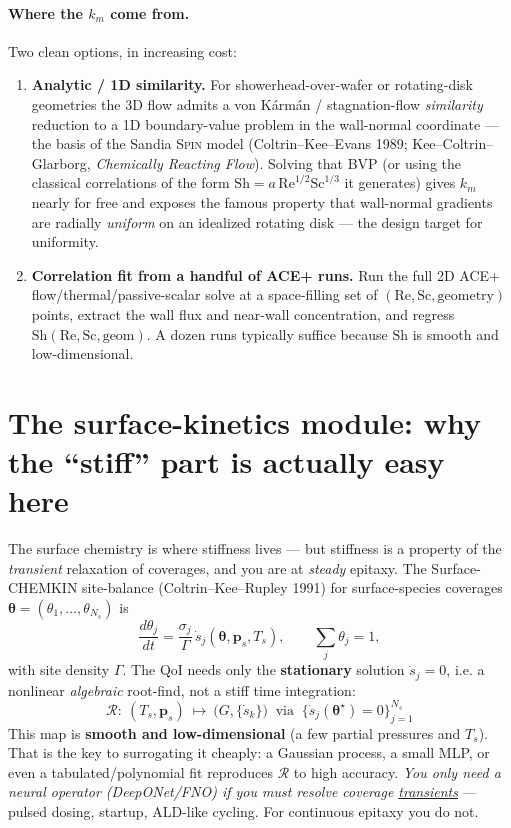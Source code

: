 \documentclass[11pt]{article}
\newcommand{\R}{\mathcal{R}}
\newcommand{\Sh}{\mathrm{Sh}}
\newcommand{\Rey}{\mathrm{Re}}
\newcommand{\Sc}{\mathrm{Sc}}
\begin{document}
\paragraph{Where the $k_m$ come from.} Two clean options, in increasing cost:
\begin{enumerate}[leftmargin=1.4em,itemsep=2pt]
\item \textbf{Analytic / 1D similarity.} For showerhead-over-wafer or rotating-disk geometries the 3D flow admits a von K\'arm\'an / stagnation-flow \emph{similarity} reduction to a 1D boundary-value problem in the wall-normal coordinate --- the basis of the Sandia \textsc{Spin} model (Coltrin--Kee--Evans 1989; Kee--Coltrin--Glarborg, \emph{Chemically Reacting Flow}). Solving that BVP (or using the classical correlations of the form $\Sh=a\,\Rey^{1/2}\Sc^{1/3}$ it generates) gives $k_m$ nearly for free and exposes the famous property that wall-normal gradients are radially \emph{uniform} on an idealized rotating disk --- the design target for uniformity.
\item \textbf{Correlation fit from a handful of ACE+ runs.} Run the full 2D ACE+ flow/thermal/passive-scalar solve at a space-filling set of $(\Rey,\Sc,\text{geometry})$ points, extract the wall flux and near-wall concentration, and regress $\Sh(\Rey,\Sc,\text{geom})$. A dozen runs typically suffice because $\Sh$ is smooth and low-dimensional.
\end{enumerate}

\section{The surface-kinetics module: why the ``stiff'' part is actually easy here}
\label{sec:surfkin}

The surface chemistry is where stiffness lives --- but stiffness is a property of the \emph{transient} relaxation of coverages, and you are at \emph{steady} epitaxy. The Surface-CHEMKIN site-balance (Coltrin--Kee--Rupley 1991) for surface-species coverages $\boldsymbol{\theta}=(\theta_1,\dots,\theta_{N_s})$ is
\begin{equation}
\frac{d\theta_j}{dt} = \frac{\sigma_j}{\Gamma}\,\dot s_j(\boldsymbol{\theta},\mathbf{p}_s,T_s),
\qquad \sum_j\theta_j=1,
\label{eq:siteODE}
\end{equation}
with site density $\Gamma$. The QoI needs only the \textbf{stationary} solution $\dot s_j=0$, i.e. a nonlinear \emph{algebraic} root-find, not a stiff time integration:
\begin{equation}
\boxed{\;\R:\ (T_s,\mathbf{p}_s)\ \longmapsto\ \big(G,\{\dot s_k\}\big)\ \text{ via }\ \{\dot s_j(\boldsymbol\theta^\star)=0\}_{j=1}^{N_s}\;}
\end{equation}
This map is \textbf{smooth and low-dimensional} (a few partial pressures and $T_s$). That is the key to surrogating it cheaply: a Gaussian process, a small MLP, or even a tabulated/polynomial fit reproduces $\R$ to high accuracy. \emph{You only need a neural operator (DeepONet/FNO) if you must resolve coverage \underline{transients}} --- pulsed dosing, startup, ALD-like cycling. For continuous epitaxy you do not.
\end{document}
